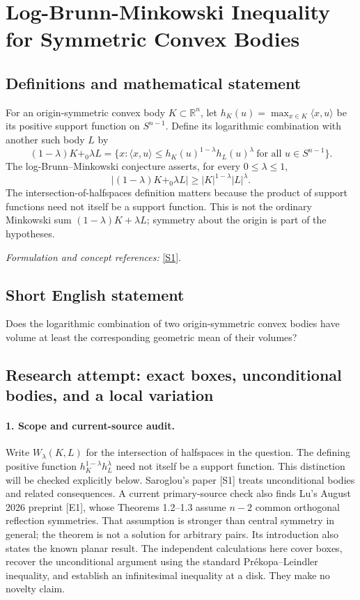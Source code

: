 \documentclass[11pt]{article}
\begin{document}
\section*{\texorpdfstring{Log-Brunn-Minkowski Inequality for Symmetric Convex Bodies}{Log-Brunn-Minkowski Inequality for Symmetric Convex Bodies}}\label{statement}
\subsection{Definitions and mathematical statement}
For an origin-symmetric convex body $K\subset{\mathbb{R}}^n$, let $h_K(u)=\max_{x\in K}\langle x,u\rangle$ be its positive support function on $S^{n-1}$. Define its logarithmic combination with another such body $L$ by
\[
 (1-\lambda)K+_0\lambda L
 =\{x:\langle x,u\rangle\le
 h_K(u)^{1-\lambda}h_L(u)^\lambda\ \text{for all }u\in S^{n-1}\}.
\]
The log-Brunn--Minkowski conjecture asserts, for every $0\le\lambda\le1$,
\[
 |(1-\lambda)K+_0\lambda L|\ge |K|^{1-\lambda}|L|^\lambda.
\]
The intersection-of-halfspaces definition matters because the product of support functions need not itself be a support function. This is not the ordinary Minkowski sum $(1-\lambda)K+\lambda L$; symmetry about the origin is part of the hypotheses.
\par\smallskip\textit{Formulation and concept references:} \href{https://arxiv.org/abs/1311.4954}{[S1]}.

\subsection{Short English statement}
Does the logarithmic combination of two origin-symmetric convex bodies have volume at least the corresponding geometric mean of their volumes?
\subsection{Research attempt: exact boxes, unconditional bodies, and a local variation}
\paragraph{1. Scope and current-source audit.}
Write $W_\lambda(K,L)$ for the intersection of halfspaces in the question. The defining positive function $h_K^{1-\lambda}h_L^\lambda$ need not itself be a support function. This distinction will be checked explicitly below. Saroglou's paper [S1] treats unconditional bodies and related consequences. A current primary-source check also finds Lu's August 2026 preprint [E1], whose Theorems 1.2--1.3 assume $n-2$ common orthogonal reflection symmetries. That assumption is stronger than central symmetry in general; the theorem is not a solution for arbitrary pairs. Its introduction also states the known planar result. The independent calculations here cover boxes, recover the unconditional argument using the standard Pr\'ekopa--Leindler inequality, and establish an infinitesimal inequality at a disk. They make no novelty claim.
\end{document}
